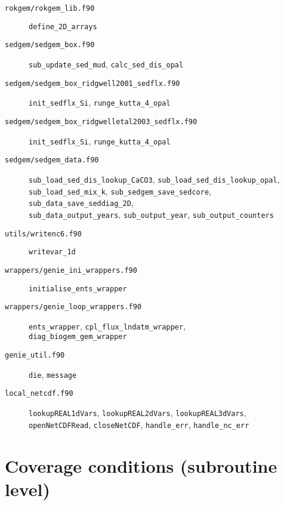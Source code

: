 \documentclass[a4paper,10pt,article]{memoir}
\begin{document}
\begin{description}
  \item[\texttt{rokgem/rokgem\_lib.f90}]{\texttt{define\_2D\_arrays}}

  \item[\texttt{sedgem/sedgem\_box.f90}]{\texttt{sub\_update\_sed\_mud},
    \texttt{calc\_sed\_dis\_opal}}

  \item[\texttt{sedgem/sedgem\_box\_ridgwell2001\_sedflx.f90}]{
    \texttt{init\_sedflx\_Si}, \texttt{runge\_kutta\_4\_opal}}

  \item[\texttt{sedgem/sedgem\_box\_ridgwelletal2003\_sedflx.f90}]{
    \texttt{init\_sedflx\_Si}, \texttt{runge\_kutta\_4\_opal}}

  \item[\texttt{sedgem/sedgem\_data.f90}]{
    \texttt{sub\_load\_sed\_dis\_lookup\_CaCO3},
    \texttt{sub\_load\_sed\_dis\_lookup\_opal}, \\
    \texttt{sub\_load\_sed\_mix\_k},
    \texttt{sub\_sedgem\_save\_sedcore},
    \texttt{sub\_data\_save\_seddiag\_2D}, \\
    \texttt{sub\_data\_output\_years}, \texttt{sub\_output\_year},
    \texttt{sub\_output\_counters}}

  \item[\texttt{utils/writenc6.f90}]{\texttt{writevar\_1d}}

  \item[\texttt{wrappers/genie\_ini\_wrappers.f90}]{
    \texttt{initialise\_ents\_wrapper}}

  \item[\texttt{wrappers/genie\_loop\_wrappers.f90}]{
    \texttt{ents\_wrapper}, \texttt{cpl\_flux\_lndatm\_wrapper}, \\

    \texttt{diag\_biogem\_gem\_wrapper}}

  \item[\texttt{genie\_util.f90}]{\texttt{die}, \texttt{message}}

  \item[\texttt{local\_netcdf.f90}]{\texttt{lookupREAL1dVars},
    \texttt{lookupREAL2dVars}, \texttt{lookupREAL3dVars},
    \texttt{openNetCDFRead}, \texttt{closeNetCDF},
    \texttt{handle\_err}, \texttt{handle\_nc\_err}}
\end{description}

\section{Coverage conditions (subroutine level)}
\end{document}
